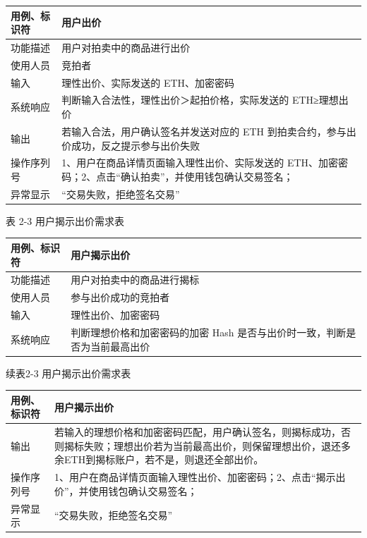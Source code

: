 \documentclass[
  10
]{article}
\newcounter{none} %
\begin{document}
{\def\LTcaptype{none} %
\begin{longtable}[]{@{}|l|l|@{}}
\toprule\noalign{}
\endhead
\bottomrule\noalign{}
\endlastfoot
\hline
用例、标识符 & 用户出价 \\
\hline
功能描述 & 用户对拍卖中的商品进行出价 \\
\hline
使用人员 & 竞拍者 \\
\hline
输入 & 理性出价、实际发送的 ETH、加密密码 \\
\hline
系统响应 & 判断输入合法性，理性出价＞起拍价格，实际发送的
ETH≥理想出价 \\
\hline
输出 & 若输入合法，用户确认签名并发送对应的 ETH
到拍卖合约，参与出价成功，反之提示参与出价失败 \\
\hline
操作序列号 & 1、用户在商品详情页面输入理性出价、实际发送的
ETH、加密密码；2、点击``确认拍卖''，并使用钱包确认交易签名； \\
\hline
异常显示 & ``交易失败，拒绝签名交易'' \\
\hline
\end{longtable}
}

表 2-3 用户揭示出价需求表

{\def\LTcaptype{none} %
\begin{longtable}[]{@{}|l|l|@{}}
\toprule\noalign{}
\endhead
\bottomrule\noalign{}
\endlastfoot
\hline
用例、标识符 & 用户揭示出价 \\
\hline
功能描述 & 用户对拍卖中的商品进行揭标 \\
\hline
使用人员 & 参与出价成功的竞拍者 \\
\hline
输入 & 理性出价、加密密码 \\
\hline
系统响应 & 判断理想价格和加密密码的加密 Hash
是否与出价时一致，判断是否为当前最高出价 \\
\hline
\end{longtable}
}

续表2-3 用户揭示出价需求表

{\def\LTcaptype{none} %
\begin{longtable}[]{@{}|l|l|@{}}
\toprule\noalign{}
\endhead
\bottomrule\noalign{}
\endlastfoot
\hline
用例、标识符 & 用户揭示出价 \\
\hline
输出 &
若输入的理想价格和加密密码匹配，用户确认签名，则揭标成功，否则揭标失败；理想出价若为当前最高出价，则保留理想出价，退还多余ETH到揭标账户，若不是，则退还全部出价。 \\
\hline
操作序列号 &
1、用户在商品详情页面输入理性出价、加密密码；2、点击``揭示出价''，并使用钱包确认交易签名； \\
\hline
异常显示 & ``交易失败，拒绝签名交易'' \\
\hline
\end{longtable}
}
\end{document}
